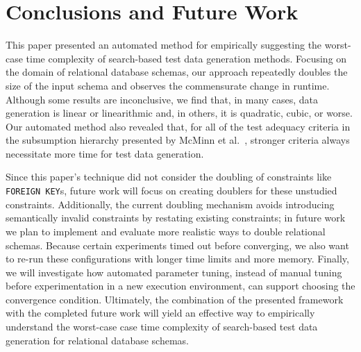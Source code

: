 
\vspace*{-.1in}
\section{Conclusions and Future Work}
\vspace*{-.1in}


This paper presented an automated method for empirically suggesting the worst-case time complexity of search-based test
data generation methods. Focusing on the domain of relational database schemas, our approach repeatedly doubles the size
of the input schema and observes the commensurate change in runtime. Although some results are inconclusive, we find
that, in many cases, data generation is linear or linearithmic and, in others, it is quadratic, cubic, or worse.  Our
automated method also revealed that, for all of the test adequacy criteria in the subsumption hierarchy presented by
McMinn et al.~\cite{mcminn2015}, stronger criteria always necessitate more time for test data generation.

Since this paper's technique did not consider the doubling of constraints like {\tt FOREIGN KEY}s, future work will
focus on creating doublers for these unstudied constraints. Additionally, the current doubling mechanism avoids
introducing semantically invalid constraints by restating existing constraints; in future work we plan to implement and
evaluate more realistic ways to double relational schemas. Because certain experiments timed out before converging, we
also want to re-run these configurations with longer time limits and more memory. Finally, we will investigate how
automated parameter tuning, instead of manual tuning before experimentation in a new execution environment, can
support choosing the convergence condition. Ultimately, the combination of the presented framework with the completed
future work will yield an effective way to empirically understand the worst-case case time complexity of search-based
test data generation for relational database schemas.

